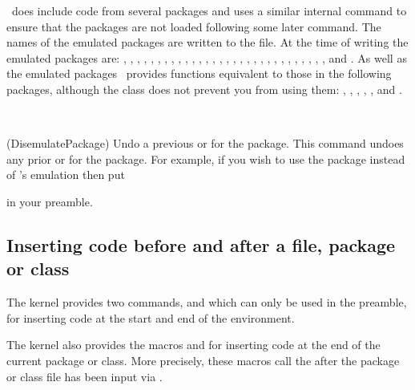 \Mname\ does include code from several packages and uses
a similar internal command to ensure that the packages are not
loaded following some later \cmd{\usepackage} command. The names of the
emulated packages are written to the  file. At the time
of writing the emulated packages are:
, , , , 
, , , , 
, , , %
, , , , 
, , , , 
, , , , , , 
, , , , 
, 
and
.
As well as the emulated packages \Mname\ provides functions 
equivalent to those in the following packages, although the class does not 
prevent you from using them:
, , , , 
, and .


\begin{syntax}
\cmd{\DisemulatePackage} \\
\end{syntax}
\glossary(DisemulatePackage)%
  {}%
  {Undo a previous  or 
   for the  package.}%
This command undoes any prior \cmd{\EmulatedPackage} or
\cmd{\EmulatedPackageWithOptions} for the  package. For example,
if you wish to use the  package instead of \Mname's
emulation then put
\begin{lcode}
\usepackage{index}
\end{lcode}
in your preamble.



\subsection{Inserting code before and after a file, package or class}

    The kernel provides two commands, \cmd{\AtBeginDocument}
and \cmd{\AtEndDocument} which can only be used in the preamble, 
for inserting code at the start and end
of the  environment. 

    The kernel also provides the macros 
\cmd{\AtEndOfPackage} and \cmd{\AtEndOfClass}
 for inserting code at the end of the current package or class. More precisely,
these macros call the  after the package or class file has been
input via \cmd{\InputIfFileExists}.

